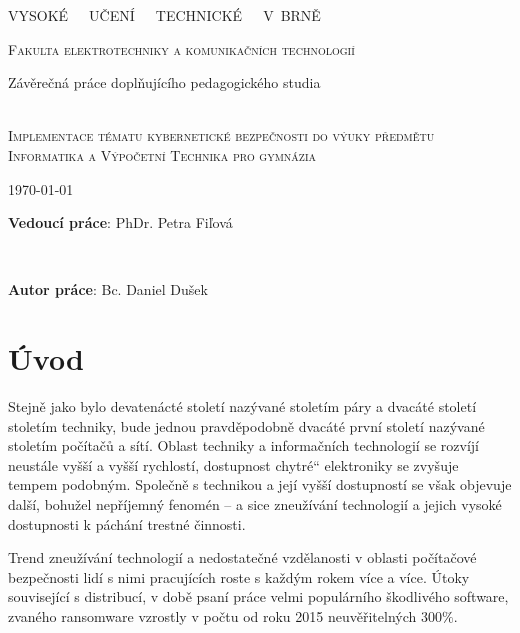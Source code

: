 \documentclass[a4paper, 12pt]{article}
\title{\thesisname}
\author{Bc. Daniel Dušek}
\providecommand{\uv}[1]{\quotedblbase #1\textquotedblleft}
\newcommand\textbox[1]{%
    \parbox{.5\textwidth}{#1}%
}
\newcommand{\thesisName}{Implementace tématu kybernetické bezpečnosti do výuky předmětu Informatika a Výpočetní Technika pro gymnázia}
\newcommand{\universityName}{VYSOKÉ~~~UČENÍ~~~TECHNICKÉ~~~V~BRNĚ}
\newcommand{\facultyName}{Fakulta elektrotechniky a komunikačních technologií}
\begin{document}
\thispagestyle{empty}
    \begin{center}
        \Huge
        \universityName \\
        
        \LARGE
        \textsc{\facultyName\\}
        
        \Large{Závěrečná práce doplňujícího pedagogického studia \\ ~ \\}
        
        \LARGE
        \textsc{\thesisName}
    \end{center}

        \noindent \textbox{\today}  \textbox{\hfill \textbf{Vedoucí práce}: PhDr. Petra Fiľová} \\
        \noindent \textbox{\hfill}  \textbox{\hfill \textbf{Autor práce}: Bc. Daniel Dušek ~~~~~}
\clearpage
\restoregeometry

\newpage
\thispagestyle{empty}
\setcounter{tocdepth}{2}
\tableofcontents

\newpage
\setcounter{page}{1}
\section{Úvod}

Stejně jako bylo devatenácté století nazývané stoletím páry a dvacáté století stoletím techniky, bude jednou pravděpodobně dvacáté první století nazývané stoletím počítačů a sítí. Oblast techniky a informačních technologií se rozvíjí neustále vyšší a vyšší rychlostí, dostupnost \uv{chytré} elektroniky se zvyšuje tempem podobným. Společně s technikou a její vyšší dostupností se však objevuje další, bohužel nepříjemný fenomén -- a sice zneužívání technologií a jejich vysoké dostupnosti k páchání trestné činnosti. 

Trend zneužívání technologií a nedostatečné vzdělanosti v oblasti počítačové bezpečnosti lidí s nimi pracujících roste s každým rokem více a více. Útoky související s distribucí, v době psaní práce velmi populárního škodlivého software, zvaného ransomware vzrostly v počtu od roku 2015 neuvěřitelných 300$\%$.
\end{document}
